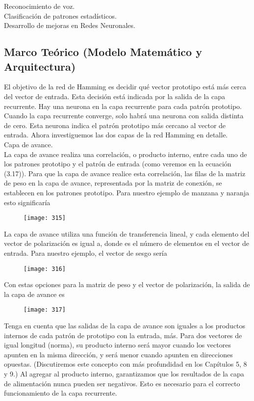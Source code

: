 \documentclass[]{article}
\begin{document}
	Reconocimiento de voz.\\	
	Clasificación de patrones estadísticos.\\
	Desarrollo de mejoras en Redes Neuronales.
	\subsection{Marco Teórico (Modelo Matemático y Arquitectura)}
		
		El objetivo de la red de Hamming es decidir qué vector prototipo está más cerca del vector de entrada. Esta decisión está indicada por la salida de la capa recurrente. Hay una neurona en la capa recurrente para cada patrón prototipo. Cuando la capa recurrente converge, solo habrá una neurona con salida distinta de cero. Esta neurona indica el patrón prototipo más cercano al vector de entrada. Ahora investiguemos las dos capas de la red Hamming en detalle.\\
		Capa de avance. \\La capa de avance realiza una correlación, o producto interno, entre cada uno de los patrones prototipo y el patrón de entrada (como veremos en la ecuación (3.17)). Para que la capa de avance realice esta correlación, las filas de la matriz de peso en la capa de avance, representada por la matriz de conexión, se establecen en los patrones prototipo. Para nuestro ejemplo de manzana y naranja esto significaría
	\begin{figure}[h]
		\centering
		\texttt{[image: 315]}
	\end{figure}	
La capa de avance utiliza una función de transferencia lineal, y cada elemento del vector de polarización es igual a, donde es el número de elementos en el vector de entrada. Para nuestro ejemplo, el vector de sesgo sería
\begin{figure}[h]
	\centering
	\texttt{[image: 316]}
\end{figure}
Con estas opciones para la matriz de peso y el vector de polarización, la salida de la capa de avance es
\begin{figure}[h]
	\centering
	\texttt{[image: 317]}
\end{figure}
Tenga en cuenta que las salidas de la capa de avance son iguales a los productos internos de cada patrón de prototipo con la entrada, más. Para dos vectores de igual longitud (norma), su producto interno será mayor cuando los vectores apunten en la misma dirección, y será menor cuando apunten en direcciones opuestas. (Discutiremos este concepto con más profundidad en los Capítulos 5, 8 y 9.) Al agregar al producto interno, garantizamos que los resultados de la capa de alimentación nunca pueden ser negativos. Esto es necesario para el correcto funcionamiento de la capa recurrente.
\end{document}
